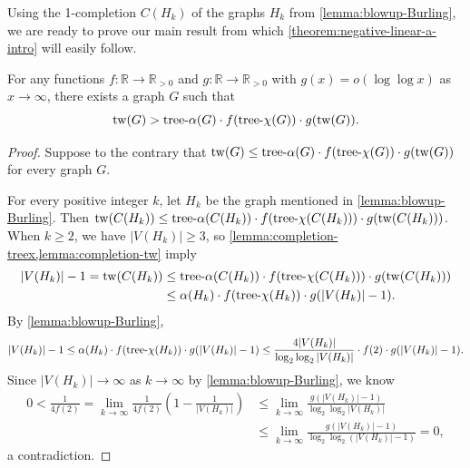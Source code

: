 \documentclass[a4paper, cleveref, autoref, thm-restate]{lipics-v2021}
\newcommand{\tw}{{\rm tw}}
\newcommand{\treea}{{\rm tree}\textnormal{-}\alpha}
\newcommand{\treex}{{\rm tree}\textnormal{-}\chi}
\begin{document}
Using the 1-completion $C(H_k)$ of the graphs $H_k$ from \cref{lemma:blowup-Burling}, we are ready to prove our main result from which \cref{theorem:negative-linear-a-intro} will easily follow.

\begin{theorem} \label{theorem:negative-linear-a}
    For any functions $f\colon {\mathbb R} \rightarrow {\mathbb R}_{>0}$ and $g\colon {\mathbb R} \rightarrow {\mathbb R}_{>0}$ with $g(x) = o(\log\log x)$ as $x \to \infty$, there exists a graph $G$ such that $$\tw(G) > \treea(G) \cdot f(\treex(G)) \cdot g(\tw(G)).$$
\end{theorem}

\begin{proof}
Suppose to the contrary that $\tw(G) \leq \treea(G) \cdot f(\treex(G)) \cdot g(\tw(G))$ for every graph $G$.

For every positive integer $k$, let $H_k$ be the graph mentioned in \cref{lemma:blowup-Burling}.
Then $\tw(C(H_k)) \leq \treea(C(H_k)) \cdot f(\treex(C(H_k))) \cdot g(\tw(C(H_k)))$. 
When $k \geq 2$, we have $|V(H_k)| \geq 3$, so \cref{lemma:completion-treex,lemma:completion-tw} imply
    \begin{align*}
        |V(H_k)|-1 = \tw(C(H_k)) & \leq \treea(C(H_k)) \cdot f(\treex(C(H_k))) \cdot g(\tw(C(H_k))) \\
        & \leq \alpha(H_k) \cdot f(\treex(H_k)) \cdot g(|V(H_k)|-1).
    \end{align*}
By \cref{lemma:blowup-Burling}, 
        $$|V(H_k)|-1 \leq \alpha(H_k) \cdot f(\treex(H_k)) \cdot g(|V(H_k)|-1) \leq \frac{4|V(H_k)|}{\log_2\log_2|V(H_k)|} \cdot f(2) \cdot g(|V(H_k)|-1).$$
Since $|V(H_k)| \to \infty$ as $k \to \infty$ by \cref{lemma:blowup-Burling}, we know %
    \begin{align*}
        0 < \frac{1}{4f(2)} = \lim_{k \to \infty}\frac{1}{4f(2)}(1 - \frac{1}{|V(H_k)|}) & \leq \lim_{k \to \infty}\frac{g(|V(H_k)|-1)}{\log_2\log_2|V(H_k)|} \\
        & \leq \lim_{k \to \infty}\frac{g(|V(H_k)|-1)}{\log_2\log_2(|V(H_k)|-1)} = 0,
    \end{align*}
a contradiction.
\end{proof}
\end{document}
